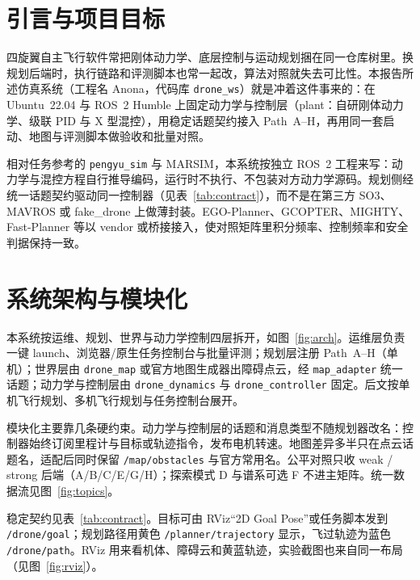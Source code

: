 \chapter{引言与项目目标}

四旋翼自主飞行软件常把刚体动力学、底层控制与运动规划捆在同一仓库树里。换规划后端时，执行链路和评测脚本也常一起改，算法对照就失去可比性。本报告所述仿真系统（工程名 Anona，代码库 \texttt{drone\_ws}）就是冲着这件事来的：在 Ubuntu~22.04 与 ROS~2 Humble 上固定动力学与控制层（plant：自研刚体动力学、级联 PID 与 X 型混控），用稳定话题契约接入 Path~A--H，再用同一套启动、地图与评测脚本做验收和批量对照。

相对任务参考的 \texttt{pengyu\_sim} 与 MARSIM，本系统按独立 ROS~2 工程来写：动力学与混控方程自行推导编码，运行时不执行、不包装对方动力学源码。规划侧经统一话题契约驱动同一控制器（见表~\ref{tab:contract}），而不是在第三方 SO3、MAVROS 或 fake\_drone 上做薄封装。EGO-Planner、GCOPTER、MIGHTY、Fast-Planner 等以 vendor 或桥接接入，使对照矩阵里积分频率、控制频率和安全判据保持一致。

\chapter{系统架构与模块化}

本系统按运维、规划、世界与动力学控制四层拆开，如图~\ref{fig:arch}。运维层负责一键 launch、浏览器/原生任务控制台与批量评测；规划层注册 Path~A--H（单机）；世界层由 \texttt{drone\_map} 或官方地图生成器出障碍点云，经 \texttt{map\_adapter} 统一话题；动力学与控制层由 \texttt{drone\_dynamics} 与 \texttt{drone\_controller} 固定。后文按单机飞行规划、多机飞行规划与任务控制台展开。


模块化主要靠几条硬约束。动力学与控制层的话题和消息类型不随规划器改名：控制器始终订阅里程计与目标或轨迹指令，发布电机转速。地图差异多半只在点云话题名，适配后同时保留 \texttt{/map/obstacles} 与官方常用名。公平对照只收 weak / strong 后端（A/B/C/E/G/H）；探索模式 D 与谱系可选 F 不进主矩阵。统一数据流见图~\ref{fig:topics}。


稳定契约见表~\ref{tab:contract}。目标可由 RViz“2D Goal Pose”或任务脚本发到 \texttt{/drone/goal}；规划路径用黄色 \texttt{/planner/trajectory} 显示，飞过轨迹为蓝色 \texttt{/drone/path}。RViz 用来看机体、障碍云和黄蓝轨迹，实验截图也来自同一布局（见图~\ref{fig:rviz}）。


